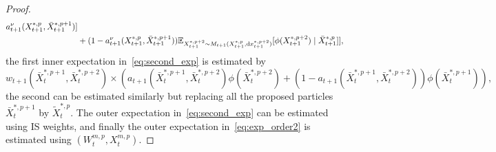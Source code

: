 \begin{proposition}
\begin{proof}
\begin{equation}
\begin{split}
                a_{t+1}^{\nu}(X_{t+1}^{*,p}, \bar{X}_{t+1}^{*,p+1})] \\
                &+ (1 -a_{t+1}^{\nu}(X_{t+1}^{*,p}, \bar{X}_{t+1}^{*,p+1})) \mathbb{E}_{X_{t+1}^{*,p+2}\sim M_{t+1}(X_{t+1}^{*,p},\mathrm{d} x_{t+1}^{*,p+2})}[\phi(X_{t+1}^{*,p+2})\mid \bar{X}_{t+1}^{*,p}]
                ],
            \end{split}
        \end{equation}
        the first inner expectation in~\eqref{eq:second_exp} is estimated by
        \begin{equation}
            w_{t+1}(\bar{X}_{t}^{*,p+1}, \bar{X}_{t}^{*,p+2})\times( a_{t+1}(\bar{X}_{t}^{*,p+1}, \bar{X}_{t}^{*,p+2}) \phi(\bar{X}_{t}^{*,p+2}) + (1-a_{t+1}(\bar{X}_{t}^{*,p+1}, \bar{X}_{t}^{*,p+2}))\phi(\bar{X}_{t}^{*,p+1})),
        \end{equation}
        the second can be estimated similarly but replacing all the proposed particles $\bar{X}_{t}^{*,p+1}$ by $\tilde{X}_{t}^{*,p}$.
        The outer expectation in~\eqref{eq:second_exp} can be estimated using IS weights, and finally the outer expectation in~\eqref{eq:exp_order2} is estimated using $(W_t^{m,p}, X_t^{m,p})$.
    \end{proof}
\end{proposition}
